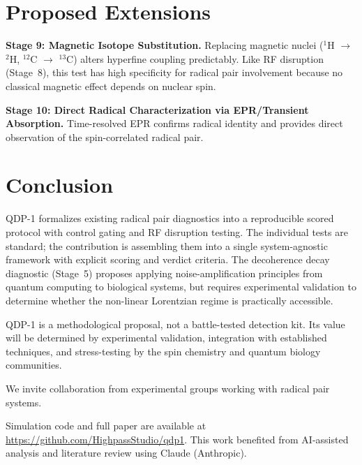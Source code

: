 \documentclass[preprint,amsmath,amssymb]{revtex4-2}
\begin{document}
\section{Proposed Extensions}

\textbf{Stage 9: Magnetic Isotope Substitution.} Replacing magnetic nuclei ($^1$H $\to$ $^2$H, $^{12}$C $\to$ $^{13}$C) alters hyperfine coupling predictably. Like RF disruption (Stage~8), this test has high specificity for radical pair involvement because no classical magnetic effect depends on nuclear spin.

\textbf{Stage 10: Direct Radical Characterization via EPR/Transient Absorption.} Time-resolved EPR confirms radical identity and provides direct observation of the spin-correlated radical pair.

\section{Conclusion}

QDP-1 formalizes existing radical pair diagnostics into a reproducible scored protocol with control gating and RF disruption testing. The individual tests are standard; the contribution is assembling them into a single system-agnostic framework with explicit scoring and verdict criteria. The decoherence decay diagnostic (Stage~5) proposes applying noise-amplification principles from quantum computing to biological systems, but requires experimental validation to determine whether the non-linear Lorentzian regime is practically accessible.

QDP-1 is a methodological proposal, not a battle-tested detection kit. Its value will be determined by experimental validation, integration with established techniques, and stress-testing by the spin chemistry and quantum biology communities.

We invite collaboration from experimental groups working with radical pair systems.

\begin{acknowledgments}
Simulation code and full paper are available at \url{https://github.com/HighpassStudio/qdp1}. This work benefited from AI-assisted analysis and literature review using Claude (Anthropic).
\end{acknowledgments}
\end{document}
